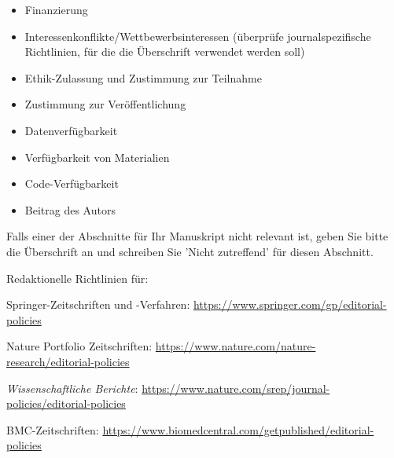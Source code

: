 \documentclass[pdflatex,sn-mathphys-num]{sn-jnl}%
\theoremstyle{thmstyleone}%
\theoremstyle{thmstyletwo}%
\theoremstyle{thmstylethree}%
\begin{document}
\begin{itemize}
\item Finanzierung
\item Interessenkonflikte/Wettbewerbsinteressen (überprüfe journalspezifische Richtlinien, für die die Überschrift verwendet werden soll)
\item Ethik-Zulassung und Zustimmung zur Teilnahme
\item Zustimmung zur Veröffentlichung
\item Datenverfügbarkeit 
\item Verfügbarkeit von Materialien
\item Code-Verfügbarkeit 
\item Beitrag des Autors
\end{itemize}

\noindent Falls einer der Abschnitte für Ihr Manuskript nicht relevant ist, geben Sie bitte die Überschrift an und schreiben Sie 'Nicht zutreffend' für diesen Abschnitt. 

\bigskip\begin{flushleft}%
Redaktionelle Richtlinien für:

\bigskip\noindent Springer-Zeitschriften und -Verfahren: \url{https://www.springer.com/gp/editorial-policies}

\bigskip\noindent Nature Portfolio Zeitschriften: \url{https://www.nature.com/nature-research/editorial-policies}

\textit{\bigskip\noindent Wissenschaftliche Berichte}: \url{https://www.nature.com/srep/journal-policies/editorial-policies}

\bigskip\noindent BMC-Zeitschriften: \url{https://www.biomedcentral.com/getpublished/editorial-policies}
\end{flushleft}
\end{document}
